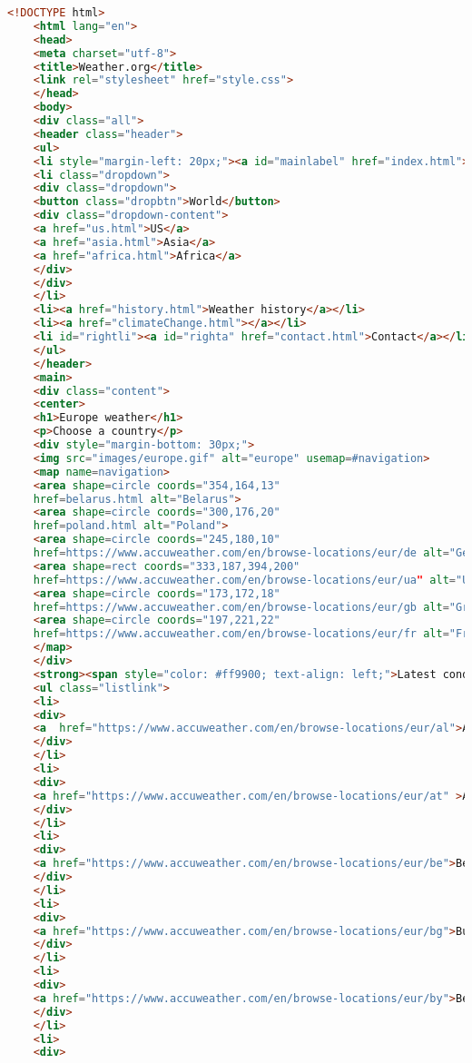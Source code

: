 \begin{lstlisting}[language=HTML,caption=Исходный код страницы Index]
    <!DOCTYPE html>
    <html lang="en">
    <head>
    <meta charset="utf-8">
    <title>Weather.org</title>
    <link rel="stylesheet" href="style.css">
    </head>
    <body>
    <div class="all">
    <header class="header">
    <ul>
    <li style="margin-left: 20px;"><a id="mainlabel" href="index.html">Weather.org</a></li>
    <li class="dropdown">
    <div class="dropdown">
    <button class="dropbtn">World</button>
    <div class="dropdown-content">
    <a href="us.html">US</a>
    <a href="asia.html">Asia</a>
    <a href="africa.html">Africa</a>
    </div>
    </div>
    </li>
    <li><a href="history.html">Weather history</a></li>
    <li><a href="climateChange.html"></a></li>
    <li id="rightli"><a id="righta" href="contact.html">Contact</a></li>
    </ul>
    </header>
    <main>
    <div class="content">
    <center>
    <h1>Europe weather</h1>
    <p>Choose a country</p>
    <div style="margin-bottom: 30px;">
    <img src="images/europe.gif" alt="europe" usemap=#navigation>
    <map name=navigation>
    <area shape=circle coords="354,164,13"
    href=belarus.html alt="Belarus">
    <area shape=circle coords="300,176,20"
    href=poland.html alt="Poland">
    <area shape=circle coords="245,180,10"
    href=https://www.accuweather.com/en/browse-locations/eur/de alt="Germany">
    <area shape=rect coords="333,187,394,200"
    href=https://www.accuweather.com/en/browse-locations/eur/ua" alt="Ukraine">
    <area shape=circle coords="173,172,18"
    href=https://www.accuweather.com/en/browse-locations/eur/gb alt="Great Britan">
    <area shape=circle coords="197,221,22"
    href=https://www.accuweather.com/en/browse-locations/eur/fr alt="France">
    </map>
    </div>
    <strong><span style="color: #ff9900; text-align: left;">Latest conditions, forecasts for major European cities, resorts</span></strong>
    <ul class="listlink">
    <li>
    <div>
    <a  href="https://www.accuweather.com/en/browse-locations/eur/al">Albania</a>
    </div>
    </li>
    <li>
    <div>
    <a href="https://www.accuweather.com/en/browse-locations/eur/at" >Austria</a>
    </div>
    </li>
    <li>
    <div>
    <a href="https://www.accuweather.com/en/browse-locations/eur/be">Belgium</a>
    </div>
    </li>
    <li>
    <div>
    <a href="https://www.accuweather.com/en/browse-locations/eur/bg">Bulgaria</a>
    </div>
    </li>
    <li>
    <div>
    <a href="https://www.accuweather.com/en/browse-locations/eur/by">Belarus</a>
    </div>
    </li>
    <li>
    <div>

\end{lstlisting}
